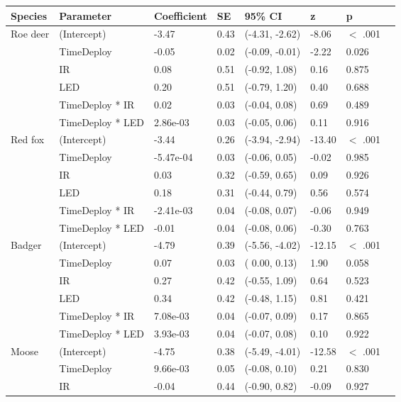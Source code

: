 \begin{table}[ht]
\centering
\small
\begin{tabular}{llllllll}
  \hline
Species & Parameter & Coefficient & SE & 95\% CI & z & p \\ 
  \hline
Roe deer & (Intercept) & -3.47 & 0.43 & (-4.31, -2.62) & -8.06 & $<$ .001 \\ 
   & TimeDeploy & -0.05 & 0.02 & (-0.09, -0.01) & -2.22 & 0.026  \\ 
   & IR & 0.08 & 0.51 & (-0.92,  1.08) & 0.16 & 0.875  \\ 
   & LED & 0.20 & 0.51 & (-0.79,  1.20) & 0.40 & 0.688  \\ 
   & TimeDeploy * IR & 0.02 & 0.03 & (-0.04,  0.08) & 0.69 & 0.489  \\ 
   & TimeDeploy * LED & 2.86e-03 & 0.03 & (-0.05,  0.06) & 0.11 & 0.916  \\ 
  Red fox & (Intercept) & -3.44 & 0.26 & (-3.94, -2.94) & -13.40 & $<$ .001 \\ 
   & TimeDeploy & -5.47e-04 & 0.03 & (-0.06,  0.05) & -0.02 & 0.985  \\ 
   & IR & 0.03 & 0.32 & (-0.59,  0.65) & 0.09 & 0.926  \\ 
   & LED & 0.18 & 0.31 & (-0.44,  0.79) & 0.56 & 0.574  \\ 
   & TimeDeploy * IR & -2.41e-03 & 0.04 & (-0.08,  0.07) & -0.06 & 0.949  \\ 
   & TimeDeploy * LED & -0.01 & 0.04 & (-0.08,  0.06) & -0.30 & 0.763  \\ 
  Badger & (Intercept) & -4.79 & 0.39 & (-5.56, -4.02) & -12.15 & $<$ .001 \\ 
   & TimeDeploy & 0.07 & 0.03 & ( 0.00,  0.13) & 1.90 & 0.058  \\ 
   & IR & 0.27 & 0.42 & (-0.55,  1.09) & 0.64 & 0.523  \\ 
   & LED & 0.34 & 0.42 & (-0.48,  1.15) & 0.81 & 0.421  \\ 
   & TimeDeploy * IR & 7.08e-03 & 0.04 & (-0.07,  0.09) & 0.17 & 0.865  \\ 
   & TimeDeploy * LED & 3.93e-03 & 0.04 & (-0.07,  0.08) & 0.10 & 0.922  \\ 
  Moose & (Intercept) & -4.75 & 0.38 & (-5.49, -4.01) & -12.58 & $<$ .001 \\ 
   & TimeDeploy & 9.66e-03 & 0.05 & (-0.08,  0.10) & 0.21 & 0.830  \\ 
   & IR & -0.04 & 0.44 & (-0.90,  0.82) & -0.09 & 0.927  \\ 

\end{tabular}
\end{table}
